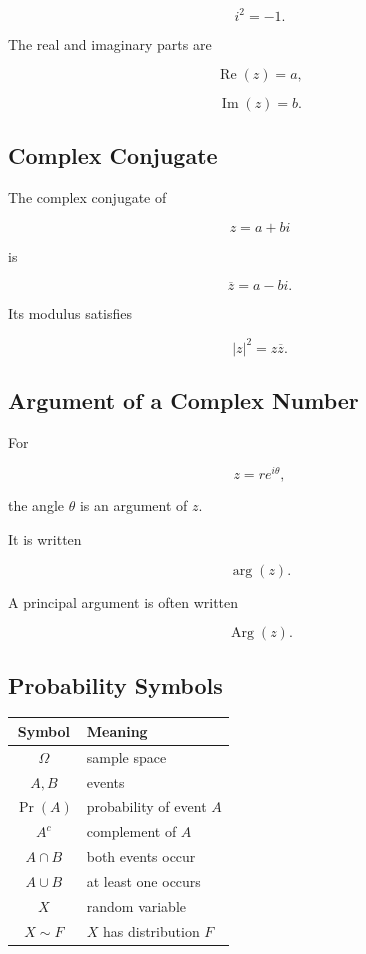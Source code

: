 \[
\boxed{
i^2=-1.
}
\]

The real and imaginary parts are

\[
\boxed{
\operatorname{Re}(z)=a,
}
\]

\[
\boxed{
\operatorname{Im}(z)=b.
}
\]

\subsection{Complex Conjugate}
\label{subsec:complex-conjugate-reference}

The complex conjugate of

\[
z=a+bi
\]

is

\[
\boxed{
\overline{z}
=
a-bi.
}
\]

Its modulus satisfies

\[
\boxed{
|z|^2
=
z\overline{z}.
}
\]

\subsection{Argument of a Complex Number}
\label{subsec:complex-argument-reference}

For

\[
z=re^{i\theta},
\]

the angle \(\theta\) is an argument of \(z\).

It is written

\[
\boxed{
\arg(z).
}
\]

A principal argument is often written

\[
\boxed{
\operatorname{Arg}(z).
}
\]

\subsection{Probability Symbols}
\label{subsec:probability-symbols-reference}

\begin{center}
\begin{tabular}{c|l}
\textbf{Symbol} & \textbf{Meaning} \\ \hline
\( \Omega \) & sample space \\
\( A,B \) & events \\
\( \Pr(A) \) & probability of event \(A\) \\
\( A^c \) & complement of \(A\) \\
\( A\cap B \) & both events occur \\
\( A\cup B \) & at least one occurs \\
\( X \) & random variable \\
\( X\sim F \) & \(X\) has distribution \(F\)
\end{tabular}
\end{center}

